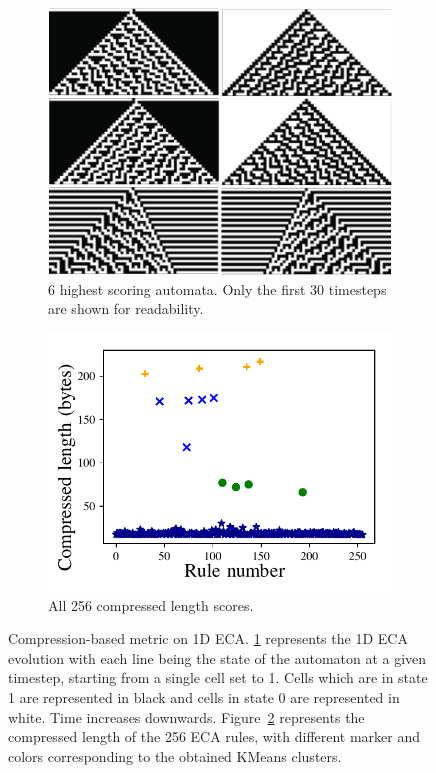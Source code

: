 \begin{figure}[tbp]
  \begin{subfigure}[b]{.47\linewidth}
    \centering
    \includegraphics[width=\linewidth]{figures/complex_eca}
    \caption{6 highest scoring automata. Only the first 30 timesteps are shown
      for readability.}
    \label{subfig:highest_6}
  \end{subfigure}
  \hspace{10pt}
  \begin{subfigure}[b]{.47\linewidth}
    \centering
    \includegraphics[width=\linewidth]{figures/one}
    \caption{All 256 compressed length scores.}
    \label{subfig:comp_scores}
  \end{subfigure}
  \caption{Compression-based metric on 1D ECA. \ref{subfig:highest_6} represents
    the 1D ECA evolution with each line being the state of the automaton at a
    given timestep, starting from a single cell set to 1. Cells which are in
    state 1 are represented in black and cells in state 0 are represented in
    white. Time increases downwards. Figure~\ref{subfig:comp_scores} represents
    the compressed length of the 256 ECA rules, with different marker and colors
    corresponding to the obtained KMeans clusters.}

  \label{fig:comp_eca}
\end{figure}


